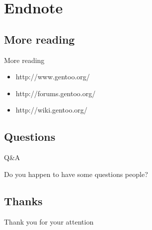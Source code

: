 \documentclass{beamer}
\begin{document}
\section{Endnote}

\subsection{More reading}
\begin{frame}{More reading}
	\begin{itemize}
		\item http://www.gentoo.org/
		\item http://forums.gentoo.org/
		\item http://wiki.gentoo.org/
	\end{itemize}
\end{frame}

\subsection{Questions}
\begin{frame}{Q\&A}
	\begin{center}Do you happen to have some questions people?\end{center}
\end{frame}

\subsection{Thanks}
\begin{frame}{}
	\begin{center}Thank you for your attention\end{center}
\end{frame}
\end{document}
